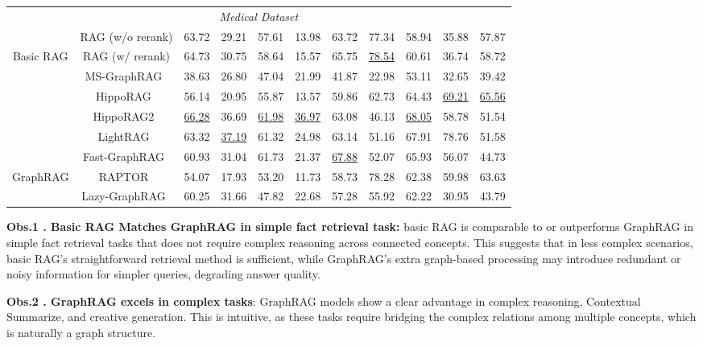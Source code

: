 \documentclass{article} %
\begin{document}
\begin{table}[!t]
{\begin{tabular}{c|c|cc|cc|cc|ccc}
\midrule
\multicolumn{11}{c}{\cellcolor[HTML]{EFEFEF}\textit{Medical Dataset}} \\
 & RAG (w/o rerank) & 63.72 & 29.21 & 57.61 & 13.98 & 63.72 & 77.34 & 58.94 & 35.88 & 57.87 \\
\multirow{-2}{*}{Basic RAG} & RAG (w/ rerank) & 64.73 & 30.75 & 58.64 & 15.57 & 65.75 & \underline{78.54} & 60.61 & 36.74 & 58.72 \\
\midrule
 & MS-GraphRAG~\citep{edge2024local} & 38.63 & 26.80 & 47.04 & 21.99 & 41.87 & 22.98 & 53.11 & 32.65 & 39.42 \\
 & HippoRAG~\citep{HippoRAG} & 56.14 & 20.95 & 55.87 & 13.57 & 59.86 & 62.73 & 64.43 & \underline{69.21} & \underline{65.56} \\
 & HippoRAG2~\citep{gutiérrez2025HippoRAG2} & \underline{66.28} & 36.69 & \underline{61.98} & \underline{36.97} & 63.08 & 46.13 & \underline{68.05} & 58.78 & 51.54 \\
 & LightRAG~\citep{guo2024lightrag} & 63.32 & \underline{37.19} & 61.32 & 24.98 & 63.14 & 51.16 & 67.91 & 78.76 & 51.58 \\
 & Fast-GraphRAG~\citep{fastgraphrag2024} & 60.93 & 31.04 & 61.73 & 21.37 & \underline{67.88} & 52.07 & 65.93 & 56.07 & 44.73 \\
\multirow{-7}{*}{GraphRAG} & RAPTOR~\citep{sarthi2024raptor} & 54.07 & 17.93 & 53.20 & 11.73 & 58.73 & 78.28 & 62.38 & 59.98 & 63.63 \\
& Lazy-GraphRAG~\citep{LazyGraphRAG} & 60.25 & 31.66 & 47.82 & 22.68 & 57.28 & 55.92 & 62.22 & 30.95 & 43.79 \\
\bottomrule
\end{tabular}
}
\vspace{-5mm}
\label{tab:main-generate}
\end{table}

\textbf{Obs.1 . Basic RAG Matches GraphRAG in simple fact retrieval task:} basic RAG is comparable to or outperforms GraphRAG in simple fact retrieval tasks that does not require complex reasoning across connected concepts. This suggests that in less complex scenarios, basic RAG's straightforward retrieval method is sufficient, while GraphRAG's extra graph-based processing may introduce redundant or noisy information for simpler queries, degrading answer quality.

\textbf{Obs.2 . GraphRAG excels in complex tasks}: GraphRAG models show a clear advantage in complex reasoning, Contextual Summarize, and creative generation. This is intuitive, as these tasks require bridging the complex relations among multiple concepts, which is naturally a graph structure.
\end{document}
